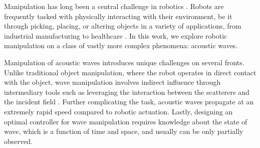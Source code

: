 

Manipulation has long been a central challenge in robotics \cite{zhu2022_challenges_robotic_manipulation, matas2018_sim_to_real_robotic_manipulation}. Robots are frequently tasked with physically interacting with their environment, be it through picking, placing, or altering objects in a variety of applications, from industrial manufacturing \cite{sanchez2018_industry_robotic_manipulation, mikkel2016_robot_industrial_manufacturing} to healthcare \cite{hamed2012_robot_surgery, boonvisut2013_robot_surgery_sensing}. In this work, we explore robotic manipulation on a class of vastly more complex phenomena: acoustic waves. 

Manipulation of acoustic waves introduces unique challenges on several fronts. Unlike traditional object manipulation, where the robot operates in direct contact with the object, wave manipulation involves indirect influence through intermediary tools such as leveraging the interaction between the scatterers and the incident field \cite{Martin06,amirkulova_2020_the, norris2011_multiple}. Further complicating the task, acoustic waves propagate at an extremely rapid speed \cite{del1972_speed_of_sound} compared to robotic actuation. Lastly, designing an optimal controller for wave manipulation requires knowledge about the state of wave, which is a function of time and space, and usually can be only partially observed. 


